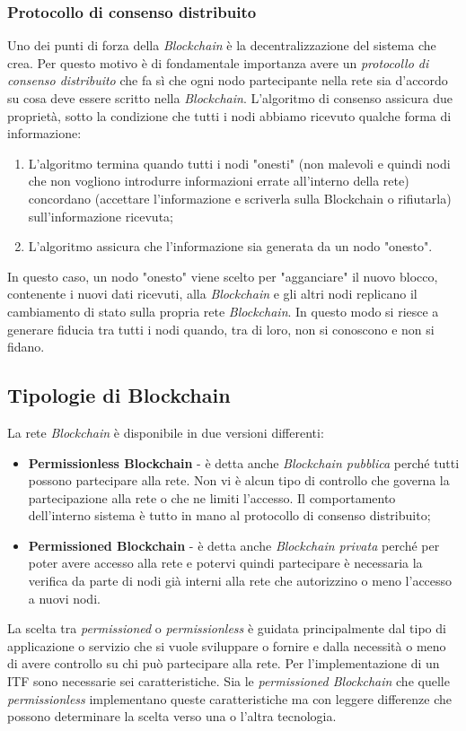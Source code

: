 \subsubsection{Protocollo di consenso distribuito}
Uno dei punti di forza della \textit{Blockchain} è la decentralizzazione del sistema che crea. Per questo motivo è di fondamentale importanza avere un \textit{protocollo di consenso distribuito} che fa sì che ogni nodo partecipante nella rete sia d'accordo su cosa deve essere scritto nella \textit{Blockchain}.
L'algoritmo di consenso assicura due proprietà, sotto la condizione che tutti i nodi abbiamo ricevuto qualche forma di informazione:
\begin{enumerate}
	\item L'algoritmo termina quando tutti i nodi "onesti" (non malevoli e quindi nodi che non vogliono introdurre informazioni errate all'interno della rete) concordano (accettare l'informazione e scriverla sulla Blockchain o rifiutarla) sull'informazione ricevuta;
	\item L'algoritmo assicura che l'informazione sia generata da un nodo "onesto".
\end{enumerate}
In questo caso, un nodo "onesto" viene scelto per "agganciare" il nuovo blocco, contenente i nuovi dati ricevuti, alla \textit{Blockchain} e gli altri nodi replicano il cambiamento di stato sulla propria rete \textit{Blockchain}. In questo modo si riesce a generare fiducia tra tutti i nodi quando, tra di loro, non si conoscono e non si fidano.

\subsection{Tipologie di Blockchain}
La rete \textit{Blockchain} è disponibile in due versioni differenti:
\begin{itemize}
	\item \textbf{Permissionless Blockchain} - è detta anche \textit{Blockchain pubblica} perché tutti possono partecipare alla rete. Non vi è alcun tipo di controllo che governa la partecipazione alla rete o che ne limiti l'accesso.  Il comportamento dell'interno sistema è tutto in mano al protocollo di consenso distribuito;
	\item \textbf{Permissioned Blockchain} - è detta anche \textit{Blockchain privata} perché per poter avere accesso alla rete e potervi quindi partecipare è necessaria la verifica da parte di nodi già interni alla rete che autorizzino o meno l'accesso a nuovi nodi.
\end{itemize}
La scelta tra \textit{permissioned} o \textit{permissionless} è guidata principalmente dal tipo di applicazione o servizio che si vuole sviluppare o fornire e dalla necessità o meno di avere controllo su chi può partecipare alla rete.
Per l'implementazione di un \gls{ITF} sono necessarie sei caratteristiche. 
Sia le \textit{permissioned Blockchain} che quelle \textit{permissionless} implementano queste caratteristiche ma con leggere differenze che possono determinare la scelta verso una o l'altra tecnologia.

